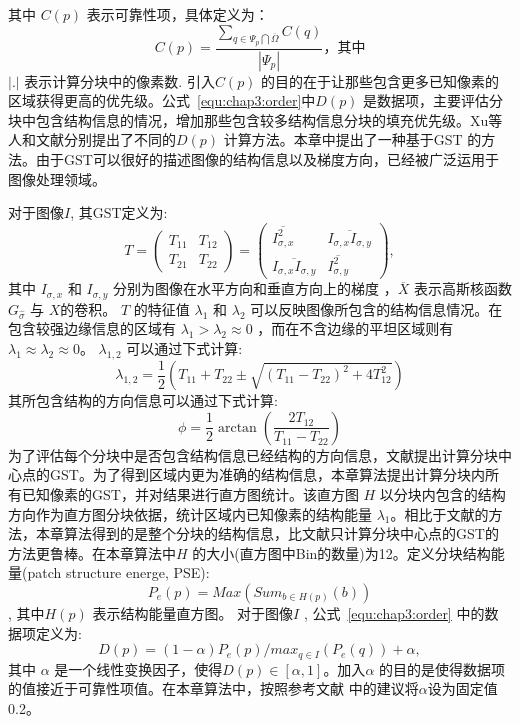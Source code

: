  其中 \(C(p)\) 表示可靠性项\cite{Criminisi04regionfilling}，具体定义为： $$C(p)=\frac{\sum_{q\in\Psi_p\bigcap\overline{\Omega}}{C(q)}}{\left\vert{\Psi_p}\right\vert}，其中$$\(\left\vert.\right\vert\)  表示计算分块中的像素数. 引入\(C(p)\) 的目的在于让那些包含更多已知像素的区域获得更高的优先级。公式~\ref{equ:chap3:order}中\(D(p)\) 是数据项，主要评估分块中包含结构信息的情况，增加那些包含较多结构信息分块的填充优先级。Xu等人\cite{Xu:2010}和文献分别提出了不同的\(D(p)\) 计算方法。本章中提出了一种基于GST 的方法。由于GST可以很好的描述图像的结构信息以及梯度方向，已经被广泛运用于图像处理领域\cite{Kothe03edgeand}。 \par
  对于图像\(I\), 其GST定义为:
  $$T=\left(\begin{array}{cc}T_{11} & T_{12} \\ T_{21} &T_{22}\end{array}\right)=\left(\begin{array}{cc}\overline{I_{\sigma,x}^2} & \overline{I_{\sigma,x}I_{\sigma,y}} \\ \overline{I_{\sigma,x}I_{\sigma,y}} & \overline{I_{\sigma,y}^2}\end{array}\right),$$
  其中 \(I_{\sigma,x}\) 和 \(I_{\sigma,y}\) 分别为图像在水平方向和垂直方向上的梯度 ，\(\overline{X}\) 表示高斯核函数\(G_{\hat{\sigma}}\) 与 \(X\)的卷积。 \(T\) 的特征值 \(\lambda_1\) 和 \(\lambda_2\) 可以反映图像所包含的结构信息情况。在包含较强边缘信息的区域有 \(\lambda_1>\lambda_2\approx0\) ，而在不含边缘的平坦区域则有\(\lambda_1\approx\lambda_2\approx0\)。 \( \lambda_{1,2} \) 可以通过下式计算: $$\lambda_{1,2}=\frac{1}{2}\left(T_{11}+T_{22}\pm\sqrt{\left(T_{11}-T_{22}\right)^2+4T^2_{12}}\right)$$
  其所包含结构的方向信息可以通过下式计算:
 $$\phi=\frac{1}{2}\arctan{\left(\frac{2T_{12}}{T_{11}-T_{22}}\right)}$$
 为了评估每个分块中是否包含结构信息已经结构的方向信息，文献提出计算分块中心点的GST。为了得到区域内更为准确的结构信息，本章算法提出计算分块内所有已知像素的GST，并对结果进行直方图统计。该直方图 \(H\) 以分块内包含的结构方向作为直方图分块依据，统计区域内已知像素的结构能量 \(\lambda_1\)。相比于文献\cite{LeMeur_2011}的方法，本章算法得到的是整个分块的结构信息，比文献\cite{LeMeur_2011}只计算分块中心点的GST的方法更鲁棒。在本章算法中\(H\) 的大小(直方图中Bin的数量)为12。定义分块结构能量(patch structure energe, PSE):
 $$P_e\left(p\right)=Max\left(Sum_{b\in{H\left(p\right)}}\left(b\right)\right)$$, 其中\(H\left(p\right)\) 表示结构能量直方图。 对于图像\(I\) , 公式~\ref{equ:chap3:order} 中的数据项定义为:
 $$D(p)=(1-\alpha)P_e(p)/max_{q\in{I}}(P_e(q))+\alpha,$$ 其中 \(\alpha\) 是一个线性变换因子，使得\(D(p)\in{[\alpha,1]}\)。加入\(\alpha\) 的目的是使得数据项的值接近于可靠性项值。在本章算法中，按照参考文献\cite{Xu:2010} 中的建议将\(\alpha\)设为固定值0.2。
